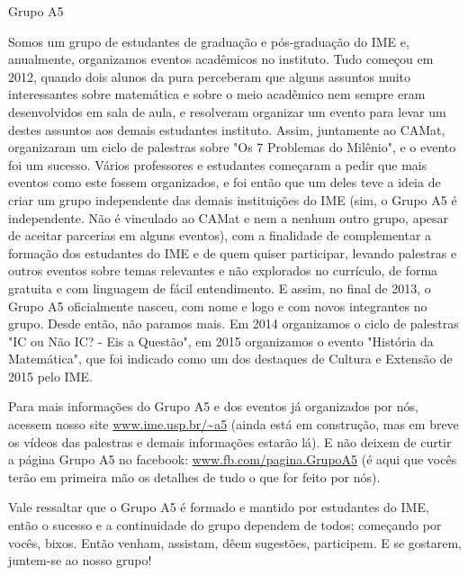 \begin{subsecao}{Grupo A5}


Somos um grupo de estudantes de graduação e pós-graduação do IME e, anualmente,
organizamos eventos acadêmicos no instituto.  Tudo começou em 2012, quando dois
alunos da pura perceberam que alguns assuntos muito interessantes sobre
matemática e sobre o meio acadêmico nem sempre eram desenvolvidos em sala de
aula, e resolveram organizar um evento para levar um destes assuntos aos demais
estudantes instituto. Assim, juntamente ao CAMat, organizaram um ciclo de
palestras sobre "Os 7 Problemas do Milênio", e o evento foi um sucesso.  Vários
professores e estudantes começaram a pedir que mais eventos como este fossem
organizados, e foi então que um deles teve a ideia de criar um grupo
independente das demais instituições do IME (sim, o Grupo A5 é independente. Não
é vinculado ao CAMat e nem a nenhum outro grupo, apesar de aceitar parcerias em
alguns eventos), com a finalidade de complementar a formação dos estudantes do
IME e de quem quiser participar, levando palestras e outros eventos sobre temas
relevantes e não explorados no currículo, de forma gratuita e com linguagem de
fácil entendimento.  E assim, no final de 2013, o Grupo A5 oficialmente nasceu,
com nome e logo e com novos integrantes no grupo.  Desde então, não paramos
mais. Em 2014 organizamos o ciclo de palestras "IC ou Não IC? - Eis a Questão",
em 2015 organizamos o evento "História da Matemática", que foi indicado como um
dos destaques de Cultura e Extensão de 2015 pelo IME.

Para mais informações do Grupo A5 e dos eventos já organizados por nós, acessem
nosso site \url{www.ime.usp.br/~a5} (ainda está em construção, mas em breve os
vídeos das palestras e demais informações estarão lá). E não deixem de curtir
a página Grupo A5 no facebook: \url{www.fb.com/pagina.GrupoA5} (é aqui que
vocês terão em primeira mão os detalhes de tudo o que for feito por nós).

Vale ressaltar que o Grupo A5 é formado e mantido por estudantes do IME, então o
sucesso e a continuidade do grupo dependem de todos; começando por vocês,
bixos. Então venham, assistam, dêem sugestões, participem. E se gostarem,
juntem-se ao nosso grupo!

\end{subsecao}
